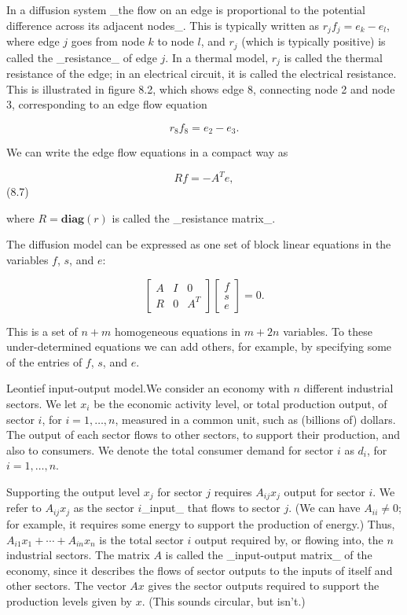 In a diffusion system _the flow on an edge is proportional to the potential difference across its adjacent nodes_. This is typically written as \(r_{j}f_{j}=e_{k}-e_{l}\), where edge \(j\) goes from node \(k\) to node \(l\), and \(r_{j}\) (which is typically positive) is called the _resistance_ of edge \(j\). In a thermal model, \(r_{j}\) is called the thermal resistance of the edge; in an electrical circuit, it is called the electrical resistance. This is illustrated in figure 8.2, which shows edge 8, connecting node 2 and node 3, corresponding to an edge flow equation

\[r_{8}f_{8}=e_{2}-e_{3}.\]

We can write the edge flow equations in a compact way as

\[Rf=-A^{T}e,\] (8.7)

where \(R=\mathbf{diag}(r)\) is called the _resistance matrix_.

The diffusion model can be expressed as one set of block linear equations in the variables \(f\), \(s\), and \(e\):

\[\left[\begin{array}{ccc}A&I&0\\ R&0&A^{T}\end{array}\right]\left[\begin{array}{c}f\\ s\\ e\end{array}\right]=0.\]

This is a set of \(n+m\) homogeneous equations in \(m+2n\) variables. To these under-determined equations we can add others, for example, by specifying some of the entries of \(f\), \(s\), and \(e\).

Leontief input-output model.We consider an economy with \(n\) different industrial sectors. We let \(x_{i}\) be the economic activity level, or total production output, of sector \(i\), for \(i=1,\ldots,n\), measured in a common unit, such as (billions of) dollars. The output of each sector flows to other sectors, to support their production, and also to consumers. We denote the total consumer demand for sector \(i\) as \(d_{i}\), for \(i=1,\ldots,n\).

Supporting the output level \(x_{j}\) for sector \(j\) requires \(A_{ij}x_{j}\) output for sector \(i\). We refer to \(A_{ij}x_{j}\) as the sector \(i\)_input_ that flows to sector \(j\). (We can have \(A_{ii}\neq 0\); for example, it requires some energy to support the production of energy.) Thus, \(A_{i1}x_{1}+\cdots+A_{in}x_{n}\) is the total sector \(i\) output required by, or flowing into, the \(n\) industrial sectors. The matrix \(A\) is called the _input-output matrix_ of the economy, since it describes the flows of sector outputs to the inputs of itself and other sectors. The vector \(Ax\) gives the sector outputs required to support the production levels given by \(x\). (This sounds circular, but isn't.) 